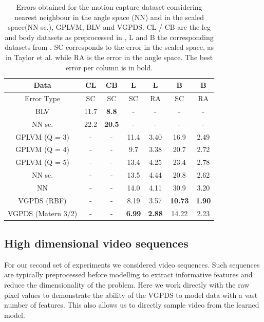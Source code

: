 \documentclass{article} %
\begin{document}
\begin{table}[h]
\caption{
\small{
Errors obtained for the motion capture dataset considering nearest neighbour in the angle space (NN) and in the scaled space(NN sc.), GPLVM, BLV and VGPDS. CL / CB are the leg and body datasets as preprocessed in \cite{Taylor}, L and B the corresponding datasets from \cite{gplvmLarger}. SC corresponds to the error in the scaled space, as in Taylor et al. while RA is the error in the angle space. The best error per column is in bold. }}
\label{motionCaptureTable}
\begin{center}
\begin{tabular}{c||c|c|c|c|c|c}
Data & CL & CB & L & L & B & B \\  \hline
Error Type & SC & SC & SC & RA & SC & RA \\
\hline \hline
BLV 			       & 11.7 & \textbf{8.8} & - & - & - & - \\  \hline
NN sc.   		       & 22.2 & \textbf{20.5} & - & - & - & - \\ \hline
GPLVM (Q = 3)	       & - & - & 11.4 & 3.40 & 16.9 & 2.49 \\ \hline
GPLVM (Q = 4)	       & - & - & 9.7  & 3.38 & 20.7 & 2.72 \\ \hline
GPLVM (Q = 5)	       & - & - & 13.4 & 4.25 & 23.4 & 2.78 \\ \hline
NN sc.  		       & - & - & 13.5 & 4.44 & 20.8 & 2.62 \\ \hline
NN 		 		       & - & - & 14.0 & 4.11 & 30.9 & 3.20 \\ \hline
VGPDS (RBF)        & - & - & 8.19 & 3.57 & \textbf{10.73} & \textbf{1.90} \\ \hline
VGPDS (Matern 3/2) & - & - & \textbf{6.99} & \textbf{2.88} & 14.22 & 2.23 \\
\end{tabular}
\end{center}
\end{table}


\subsection{High dimensional video sequences}

For our second set of experiments we considered video sequences. Such
sequences are typically preprocessed before modelling to extract
informative features and reduce the dimensionality of the
problem. Here we work directly with the raw pixel values to
demonstrate the ability of the VGPDS to model data with a vast number
of features. This also allows us to directly sample video from the
learned model.
\end{document}
